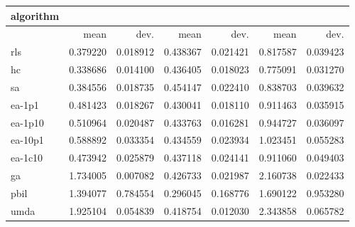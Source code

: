 \begin{tabular}{@{}l*{6}{>{{}}N{1}{2}}@{}}
\toprule
{algorithm} &  &  &  \\
\midrule
& {mean} & {dev.} & {mean} & {dev.} & {mean} & {dev.} \\
\midrule
rls & 0.379220 & 0.018912 & 0.438367 & 0.021421 & 0.817587 & 0.039423 \\
 hc & 0.338686 & 0.014100 & 0.436405 & 0.018023 & 0.775091 & 0.031270 \\
 sa & 0.384556 & 0.018735 & 0.454147 & 0.022410 & 0.838703 & 0.039632 \\
 ea-1p1 & 0.481423 & 0.018267 & 0.430041 & 0.018110 & 0.911463 & 0.035915 \\
 ea-1p10 & 0.510964 & 0.020487 & 0.433763 & 0.016281 & 0.944727 & 0.036097 \\
 ea-10p1 & 0.588892 & 0.033354 & 0.434559 & 0.023934 & 1.023451 & 0.055283 \\
 ea-1c10 & 0.473942 & 0.025879 & 0.437118 & 0.024141 & 0.911060 & 0.049403 \\
 ga & 1.734005 & 0.007082 & 0.426733 & 0.021987 & 2.160738 & 0.022433 \\
 pbil & 1.394077 & 0.784554 & 0.296045 & 0.168776 & 1.690122 & 0.953280 \\
 umda & 1.925104 & 0.054839 & 0.418754 & 0.012030 & 2.343858 & 0.065782 \\
 \bottomrule
\end{tabular}
